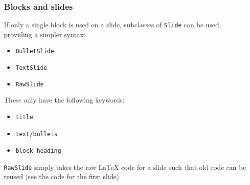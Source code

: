\documentclass{beamer}
\begin{document}
\begin{frame}[fragile]
\frametitle{Blocks and slides}

\pause
\begin{block}

If only a single block is used on a slide, subclasses of \texttt{Slide} can be used, providing a simpler syntax:

\end{block}
\pause
\begin{block}

\begin{itemize}
\item \texttt{BulletSlide}
\item \texttt{TextSlide}
\item \texttt{RawSlide}
\end{itemize}

\end{block}
\pause
\begin{block}

These only have the following keywords:

\end{block}
\pause
\begin{block}

\begin{itemize}
\item \begin{Verbatim}[fontsize=\footnotesize,tabsize=4,baselinestretch=0.85,fontfamily=tt,xleftmargin=7mm]
title
\end{Verbatim}

\item \begin{Verbatim}[fontsize=\footnotesize,tabsize=4,baselinestretch=0.85,fontfamily=tt,xleftmargin=7mm]
text/bullets
\end{Verbatim}

\item \begin{Verbatim}[fontsize=\footnotesize,tabsize=4,baselinestretch=0.85,fontfamily=tt,xleftmargin=7mm]
block_heading
\end{Verbatim}

\end{itemize}

\end{block}
\pause
\begin{block}

\texttt{RawSlide} simply takes the raw \LaTeX{} code for a slide such that old code can be reused (see the code for the first slide)

\end{block}

\end{frame}
\end{document}
